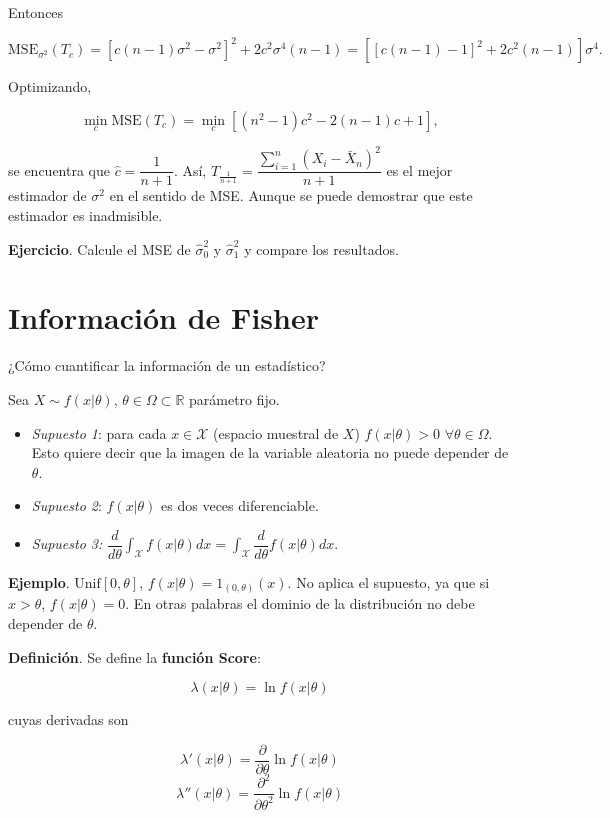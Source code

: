 \documentclass[
  12pt,
]{book}
\begin{document}
Entonces

\[\mathrm{MSE}_{\sigma^2}(T_c) = [c(n-1)\sigma^2-\sigma^2]^2+2c^2\sigma^4(n-1) =
[[c(n-1)-1]^2+2c^2(n-1)]\sigma^4.\]

Optimizando,

\[\min_c \mathrm{MSE}(T_c) = \min_c[(n^2-1)c^2-2(n-1)c+1],\]

se encuentra que \(\hat c = \dfrac 1{n+1}\). Así,
\(T_{\frac{1}{n+1}} = \dfrac{\sum_{i=1}^{n}\left(X_{i}-\bar{X}_{n}\right)^{2}}{n+1}\)
es el mejor estimador de \(\sigma^2\) en el sentido de MSE. Aunque se puede
demostrar que este estimador es inadmisible.

\textbf{Ejercicio}. Calcule el MSE de \(\hat\sigma_0^2\) y \(\hat\sigma_1^2\) y compare
los resultados.

\hypertarget{informaciuxf3n-de-fisher}{%
\section{Información de Fisher}\label{informaciuxf3n-de-fisher}}

¿Cómo cuantificar la información de un estadístico?

Sea \(X\sim f(x|\theta)\), \(\theta \in \Omega \subset \mathbb R\) parámetro fijo.

\begin{itemize}
\item
  \emph{Supuesto 1}: para cada \(x \in \mathcal X\) (espacio muestral de \(X\)) \(f(x|\theta)> 0\) \(\forall \theta \in \Omega\). Esto quiere decir que la imagen de la variable aleatoria no puede depender de \(\theta\).
\item
  \emph{Supuesto 2}: \(f(x|\theta)\) es dos veces diferenciable.
\item
  \emph{Supuesto 3:} \(\dfrac d{d\theta}\int_{\mathcal X}f(x|\theta)dx = \int_{\mathcal X}\dfrac d{d\theta}f(x|\theta)dx\).
\end{itemize}

\textbf{Ejemplo}. \(\text{Unif}[0,\theta]\), \(f(x|\theta) = 1_{(0,\theta)}(x)\). No
aplica el supuesto, ya que si \(x>\theta\), \(f(x|\theta) = 0\). En otras palabras
el dominio de la distribución no debe depender de \(\theta\).

\textbf{Definición}. Se define la \textbf{función Score}:

\[\lambda(x|\theta)=\ln f(x|\theta)\]

cuyas derivadas son

\[\lambda'(x|\theta) = \dfrac \partial{\partial \theta}\ln f(x|\theta)\]
\[\lambda''(x|\theta) = \dfrac {\partial^2}{\partial \theta^2}\ln f(x|\theta)\]
\end{document}
